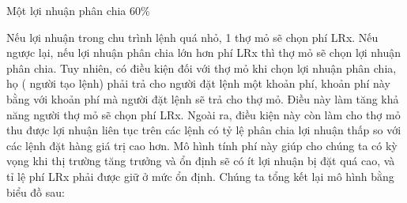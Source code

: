 \documentclass{article}
\makeatletter
\newenvironment{figurehere}
 {\def\@captype{figure}}
 {}
\makeatother
\begin{document}
\begin{multicols}{2}
\begin{center}
\begin{figurehere}
\caption{Một lợi nhuận phân chia 60\%}
\label{fig:marginsplit}
\end{figurehere}
\end{center}
Nếu lợi nhuận trong chu trình lệnh quá nhỏ, 1 thợ mỏ sẽ chọn phí LRx. Nếu ngược lại, nếu lợi nhuận phân chia lớn hơn phí LRx thì thợ mỏ sẽ chọn lợi nhuận phân chia. Tuy nhiên, có điều kiện đối với thợ mỏ khi chọn lợi nhuận phân chia, họ ( người tạo lệnh) phải trả cho người đặt lệnh một khoản phí, khoản phí này bằng với khoản phí mà người đặt lệnh sẽ trả cho thợ mỏ. Điều này làm tăng khả năng người thợ mỏ sẽ chọn phí LRx. Ngoài ra, điều kiện này còn làm cho thợ mỏ thu được lợi nhuận liên tục trên các lệnh có tỷ lệ phân chia lợi nhuận thấp so với các lệnh đặt hàng giá trị cao hơn. Mô hình tính phí này giúp cho chúng ta có kỳ vọng khi thị trường tăng trưởng và ổn định sẽ có ít lợi nhuận bị đặt quá cao, và tỉ lệ phí LRx phải được giữ ở mức ổn định.
Chúng ta tổng kết lại mô hình bằng biểu đồ sau:
\begin{center}
\begin{figurehere}
\centering
{}
\end{figurehere}
\end{center}
\end{multicols}
\end{document}
